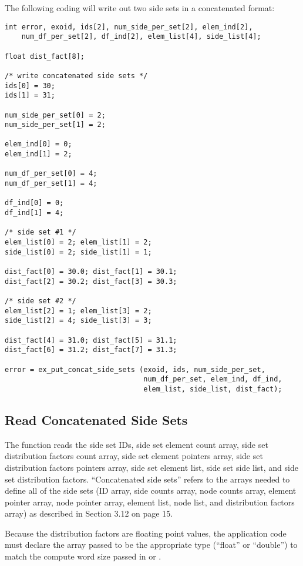 The following coding will write out two side sets in a concatenated
format:
\begin{lstlisting}
int error, exoid, ids[2], num_side_per_set[2], elem_ind[2],
    num_df_per_set[2], df_ind[2], elem_list[4], side_list[4];

float dist_fact[8];

/* write concatenated side sets */
ids[0] = 30;
ids[1] = 31;

num_side_per_set[0] = 2;
num_side_per_set[1] = 2;

elem_ind[0] = 0;
elem_ind[1] = 2;

num_df_per_set[0] = 4;
num_df_per_set[1] = 4;

df_ind[0] = 0;
df_ind[1] = 4;

/* side set #1 */
elem_list[0] = 2; elem_list[1] = 2;
side_list[0] = 2; side_list[1] = 1;

dist_fact[0] = 30.0; dist_fact[1] = 30.1;
dist_fact[2] = 30.2; dist_fact[3] = 30.3;

/* side set #2 */
elem_list[2] = 1; elem_list[3] = 2;
side_list[2] = 4; side_list[3] = 3;

dist_fact[4] = 31.0; dist_fact[5] = 31.1;
dist_fact[6] = 31.2; dist_fact[7] = 31.3;

error = ex_put_concat_side_sets (exoid, ids, num_side_per_set,
                                 num_df_per_set, elem_ind, df_ind,
                                 elem_list, side_list, dist_fact);
\end{lstlisting}


\subsection{Read Concatenated Side Sets}

The function  reads the side set
IDs, side set element count array, side set distribution factors count
array, side set element pointers array, side set distribution factors
pointers array, side set element list, side set side list, and side
set distribution factors. ``Concatenated side sets'' refers to the
arrays needed to define all of the side sets (ID array, side counts
array, node counts array, element pointer array, node pointer array,
element list, node list, and distribution factors array) as described
in Section 3.12 on page 15.


Because the distribution factors are floating point values, the
application code must declare the array passed to be the appropriate
type (``float'' or ``double'') to match the compute word size passed
in  or .


